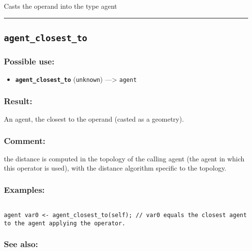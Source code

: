 \documentclass[]{book}
\providecommand{\tightlist}{%
  \setlength{\itemsep}{0pt}\setlength{\parskip}{0pt}}
\theoremstyle{definition}
\theoremstyle{definition}
\theoremstyle{definition}
\theoremstyle{remark}
\begin{document}
Casts the operand into the type agent

\begin{center}\rule{0.5\linewidth}{\linethickness}\end{center}

\subsection{\texorpdfstring{\texttt{agent\_closest\_to}}{agent\_closest\_to}}\label{agent_closest_to}

\subsubsection{Possible use:}\label{possible-use-26}

\begin{itemize}
\tightlist
\item
  \textbf{\texttt{agent\_closest\_to}} (\texttt{unknown})
  ---\textgreater{} \texttt{agent}
\end{itemize}

\subsubsection{Result:}\label{result-25}

An agent, the closest to the operand (casted as a geometry).

\subsubsection{Comment:}\label{comment-4}

the distance is computed in the topology of the calling agent (the agent
in which this operator is used), with the distance algorithm specific to
the topology.

\subsubsection{Examples:}\label{examples-19}

\begin{verbatim}
 
agent var0 <- agent_closest_to(self); // var0 equals the closest agent to the agent applying the operator.
\end{verbatim}

\subsubsection{See also:}\label{see-also-18}
\end{document}

